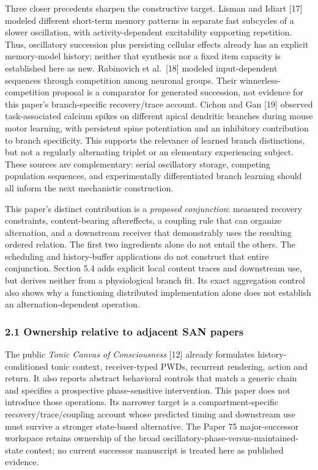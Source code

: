 \documentclass[
  american,
  11pt,
  letterpaper,
]{article}
\begin{document}
Three closer precedents sharpen the constructive target. Lisman and Idiart {[}17{]} modeled different short-term memory patterns in separate fast subcycles of a slower oscillation, with activity-dependent excitability supporting repetition. Thus, oscillatory succession plus persisting cellular effects already has an explicit memory-model history; neither that synthesis nor a fixed item capacity is established here as new. Rabinovich et al.~{[}18{]} modeled input-dependent sequences through competition among neuronal groups. Their winnerless-competition proposal is a comparator for generated succession, not evidence for this paper's branch-specific recovery/trace account. Cichon and Gan {[}19{]} observed task-associated calcium spikes on different apical dendritic branches during mouse motor learning, with persistent spine potentiation and an inhibitory contribution to branch specificity. This supports the relevance of learned branch distinctions, but not a regularly alternating triplet or an elementary experiencing subject. These sources are complementary: serial oscillatory storage, competing population sequences, and experimentally differentiated branch learning should all inform the next mechanistic construction.

This paper's distinct contribution is a \emph{proposed conjunction}: measured recovery constraints, content-bearing aftereffects, a coupling rule that can organize alternation, and a downstream receiver that demonstrably uses the resulting ordered relation. The first two ingredients alone do not entail the others. The scheduling and history-buffer applications do not construct that entire conjunction. Section 5.4 adds explicit local content traces and downstream use, but derives neither from a physiological branch fit. Its exact aggregation control also shows why a functioning distributed implementation alone does not establish an alternation-dependent operation.

\subsubsection{2.1 Ownership relative to adjacent SAN papers}\label{ownership-relative-to-adjacent-san-papers}

The public \emph{Tonic Canvas of Consciousness} {[}12{]} already formulates history-conditioned tonic context, receiver-typed PWDs, recurrent rendering, action and return. It also reports abstract behavioral controls that match a generic chain and specifies a prospective phase-sensitive intervention. This paper does not introduce those operations. Its narrower target is a compartment-specific recovery/trace/coupling account whose predicted timing and downstream use must survive a stronger state-based alternative. The Paper 75 major-successor workspace retains ownership of the broad oscillatory-phase-versus-maintained-state contest; no current successor manuscript is treated here as published evidence.
\end{document}
